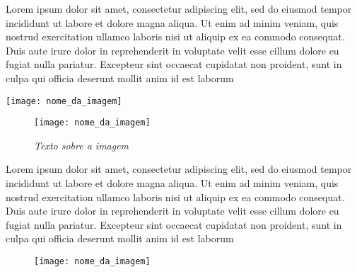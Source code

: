 
\begin{minipage}{0.7\textwidth}
Lorem ipsum dolor sit amet, consectetur adipiscing elit, sed do eiusmod tempor
incididunt ut labore et dolore magna aliqua. Ut enim ad minim veniam, quis
nostrud exercitation ullamco laboris nisi ut aliquip ex ea commodo consequat.
Duis aute irure dolor in reprehenderit in voluptate velit esse cillum dolore
eu fugiat nulla pariatur. Excepteur sint occaecat cupidatat non proident, sunt
in culpa qui officia deserunt mollit anim id est laborum
\end{minipage}
\hfill
\begin{minipage}{0.2\textwidth}
  \centering
  \texttt{[image: nome\_da\_imagem]}
\end{minipage}



\begin{wrapfigure}{r}{0.4\textwidth}  %
  \centering
  \texttt{[image: nome\_da\_imagem]}
  \caption{\textit{Texto sobre a imagem}}
\end{wrapfigure}
Lorem ipsum dolor sit amet, consectetur adipiscing elit, sed do eiusmod tempor
incididunt ut labore et dolore magna aliqua. Ut enim ad minim veniam, quis
nostrud exercitation ullamco laboris nisi ut aliquip ex ea commodo consequat.
Duis aute irure dolor in reprehenderit in voluptate velit esse cillum dolore
eu fugiat nulla pariatur. Excepteur sint occaecat cupidatat non proident, sunt
in culpa qui officia deserunt mollit anim id est laborum


\begin{figure}[H]
\centering
\texttt{[image: nome\_da\_imagem]}
\end{figure} 
